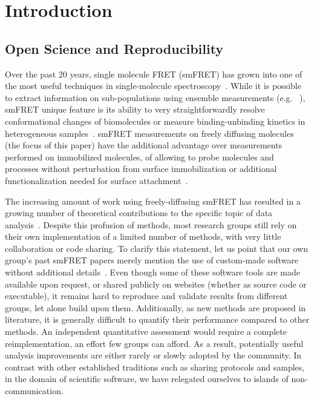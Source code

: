 \section{Introduction}

\subsection{Open Science and Reproducibility}

Over the past 20 years, single molecule FRET (smFRET) has grown into one of the most
useful techniques in single-molecule spectroscopy~\cite{Weiss_1999,Hohlbein_2014}.
While it is possible to extract information on sub-populations using ensemble measurements 
(e.g. ~\cite{Lerner_2014,Rahamim_2015}),
smFRET unique feature is its ability to very straightforwardly resolve conformational
changes of biomolecules or measure binding-unbinding kinetics in heterogeneous 
samples~\cite{Selvin_2000,Roy_2008}.
smFRET measurements on freely diffusing molecules (the focus of this paper) 
have the additional advantage over measurements performed on immobilized molecules, 
of allowing to probe molecules and processes without perturbation from surface
immobilization or additional functionalization needed for surface 
attachment~\cite{Eggeling_1998,Dahan_1999}.

The increasing amount of work using freely-diffusing smFRET has resulted 
in a growing number of theoretical contributions to the specific topic of data 
analysis~\cite{Fries_1998,Eggeling_2001,Zhang_2005,Gopich_2005,Lee_2005,Nir_2006,Antonik2006,Gopich_2007,Gopich_2008,Camley_2009,Santoso_2010,Torella_2011,Tomov_2012}. 
Despite this profusion of methods, most research groups still rely on 
their own implementation of a limited number of methods, with very little 
collaboration or code sharing. 
To clarify this statement, let us point that our own group's past smFRET papers 
merely mention the use of custom-made software without additional details~\cite{Lee_2005,Nir_2006}. 
Even though some of these software tools are made available upon request, 
or shared publicly on websites (whether as source code or executable), 
it remains hard to reproduce and validate results from different groups, 
let alone build upon them. 
Additionally, as new methods are proposed in literature,
it is generally difficult to quantify their performance compared to other methods.
An independent quantitative assessment
would require a complete reimplementation, an effort few groups can afford.
As a result, potentially useful analysis improvements
are either rarely or slowly adopted by the community.
In contrast with other established traditions such as
sharing protocols and samples, in the domain of scientific software,
we have relegated ourselves to islands of non-communication.

